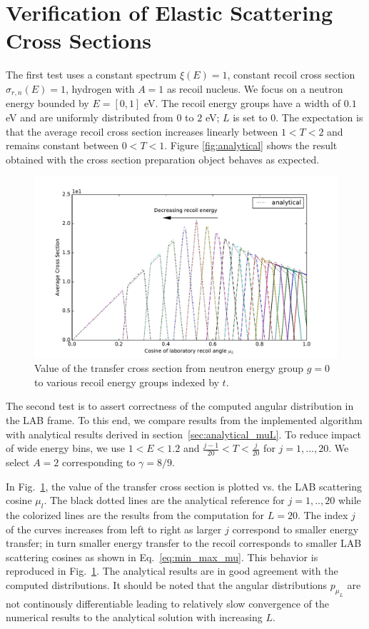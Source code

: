 \documentclass[review]{elsarticle}
\begin{document}
\section{Verification of Elastic Scattering Cross Sections}
The first test uses a constant spectrum $\xi(E)=1$, constant recoil cross section $\sigma_{r,n}(E)=1$, hydrogen with $A=1$ as recoil nucleus. We focus on a neutron energy bounded by $E=[0,1]$ eV. The recoil energy groups have a width of $0.1$ eV and are uniformly distributed from $0$ to $2$ eV; $L$ is set to $0$. The expectation is that the average recoil cross section increases linearly between $1<T<2$ and remains constant between $0<T<1$.  Figure \ref{fig:analytical} shows the result obtained with the cross section preparation object behaves as expected. 
\begin{figure}[t!]
	\centering
	\includegraphics[width=1\linewidth]{erxs_analytical_mu.pdf}
	\caption{Value of the transfer cross section from neutron energy group $g=0$ to various recoil energy groups indexed by $t$.}
	\label{fig:analytical_vs_angle}
\end{figure}


The second test is to assert correctness of the computed angular distribution in the LAB frame. To this end, we compare results from the implemented algorithm with 
analytical results derived in section~\ref{sec:analytical_muL}. To reduce impact of wide energy bins, we use $1<E< 1.2$ and $\frac{j-1}{20}< T < \frac{j}{20}$ for $j=1,...,20$.
We select $A=2$ corresponding to $\gamma = 8/9$.

In Fig.~\ref{fig:analytical_vs_angle}, the value of the transfer cross section is plotted vs. the LAB scattering cosine $\mu_l$. The black dotted lines are the analytical reference for $j=1,..,20$ while the colorized lines are the results from the computation for $L=20$. 
The index $j$ of the curves increases from left to right as larger $j$ correspond to smaller energy transfer; in turn smaller energy transfer to the recoil corresponds to smaller LAB scattering cosines as shown in Eq.~\ref{eq:min_max_mu}. This behavior is reproduced in Fig.~\ref{fig:analytical_vs_angle}. The analytical results are in good agreement with the computed distributions. It should be noted that the angular distributions $p_{\mu_L}$ are not continously differentiable leading to relatively slow convergence of the numerical results to the analytical solution with increasing $L$.
\end{document}
